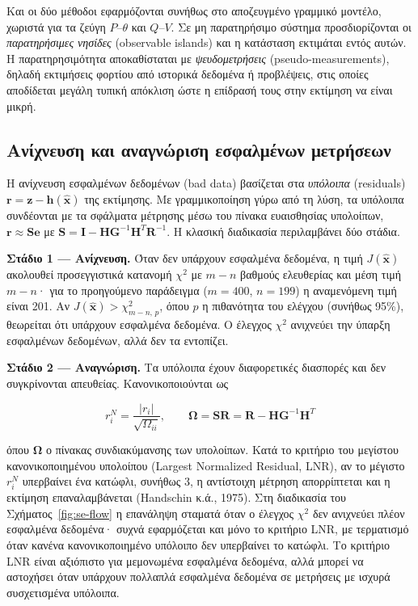 Και οι δύο μέθοδοι εφαρμόζονται συνήθως στο αποζευγμένο γραμμικό μοντέλο, χωριστά για τα
ζεύγη $P$--$\theta$ και $Q$--$V$. Σε μη παρατηρήσιμο σύστημα προσδιορίζονται οι
\emph{παρατηρήσιμες νησίδες} (observable islands) και η κατάσταση εκτιμάται εντός αυτών. Η
παρατηρησιμότητα αποκαθίσταται με \emph{ψευδομετρήσεις} (pseudo-measurements), δηλαδή
εκτιμήσεις φορτίου από ιστορικά δεδομένα ή προβλέψεις, στις οποίες αποδίδεται μεγάλη τυπική
απόκλιση ώστε η επίδρασή τους στην εκτίμηση να είναι μικρή.

\subsection{Ανίχνευση και αναγνώριση εσφαλμένων μετρήσεων}
\label{sec:baddata}

Η ανίχνευση εσφαλμένων δεδομένων (bad data) βασίζεται στα \emph{υπόλοιπα} (residuals)
$\mathbf{r} = \mathbf{z}-\mathbf{h}(\hat{\mathbf{x}})$ της εκτίμησης. Με γραμμικοποίηση γύρω από
τη λύση, τα υπόλοιπα συνδέονται με τα σφάλματα μέτρησης μέσω του πίνακα ευαισθησίας
υπολοίπων, $\mathbf{r} \approx \mathbf{S}\mathbf{e}$ με
$\mathbf{S} = \mathbf{I} - \mathbf{H}\mathbf{G}^{-1}\mathbf{H}^{T}\mathbf{R}^{-1}$. Η κλασική
διαδικασία περιλαμβάνει δύο στάδια.

\textbf{Στάδιο 1 --- Ανίχνευση.} Όταν δεν υπάρχουν εσφαλμένα δεδομένα, η τιμή
$J(\hat{\mathbf{x}})$ ακολουθεί προσεγγιστικά κατανομή $\chi^2$ με $m-n$ βαθμούς ελευθερίας
και μέση τιμή $m-n$· για το προηγούμενο παράδειγμα ($m = 400$, $n = 199$) η αναμενόμενη τιμή
είναι 201. Αν $J(\hat{\mathbf{x}}) > \chi^2_{m-n,\,p}$, όπου $p$ η πιθανότητα του ελέγχου
(συνήθως 95\%), θεωρείται ότι υπάρχουν εσφαλμένα δεδομένα. Ο έλεγχος $\chi^2$ ανιχνεύει την
ύπαρξη εσφαλμένων δεδομένων, αλλά δεν τα εντοπίζει.

\textbf{Στάδιο 2 --- Αναγνώριση.} Τα υπόλοιπα έχουν διαφορετικές διασπορές και δεν
συγκρίνονται απευθείας. Κανονικοποιούνται ως

\begin{equation}
r_i^{N} = \frac{|r_i|}{\sqrt{\Omega_{ii}}}, \qquad
\boldsymbol{\Omega} = \mathbf{S}\mathbf{R} = \mathbf{R} - \mathbf{H}\mathbf{G}^{-1}\mathbf{H}^{T}
\label{eq:normres}
\end{equation}

όπου $\boldsymbol{\Omega}$ ο πίνακας συνδιακύμανσης των υπολοίπων. Κατά το κριτήριο του
μεγίστου κανονικοποιημένου υπολοίπου (Largest Normalized Residual, LNR), αν το μέγιστο
$r_i^{N}$ υπερβαίνει ένα κατώφλι, συνήθως 3, η αντίστοιχη μέτρηση απορρίπτεται και η
εκτίμηση επαναλαμβάνεται (Handschin κ.ά., 1975). Στη διαδικασία του Σχήματος~\ref{fig:se-flow}
η επανάληψη σταματά όταν ο έλεγχος $\chi^2$ δεν ανιχνεύει πλέον εσφαλμένα δεδομένα· συχνά
εφαρμόζεται και μόνο το κριτήριο LNR, με τερματισμό όταν κανένα κανονικοποιημένο υπόλοιπο δεν
υπερβαίνει το κατώφλι. Το κριτήριο LNR είναι αξιόπιστο για μεμονωμένα
εσφαλμένα δεδομένα, αλλά μπορεί να αστοχήσει όταν υπάρχουν πολλαπλά εσφαλμένα δεδομένα σε
μετρήσεις με ισχυρά συσχετισμένα υπόλοιπα.

